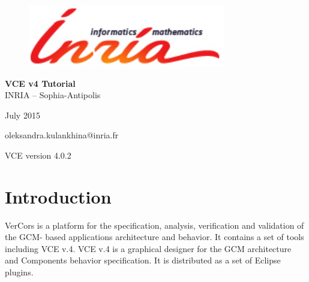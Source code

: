 \documentclass[12pt]{article}
\begin{document}
\begin{titlepage}

\begin{figure}[t]
    \centering
    \includegraphics[scale=0.4]{./draws/inria-logo.png}
\end{figure}

\vspace*{2cm}
\begin{center}
	{\huge \textbf{VCE v4 Tutorial}} \vspace*{1cm}
\\
    {\large INRIA – Sophia-Antipolis } \medskip \\
\end{center}

%
\vfill
\begin{center}
\begin{minipage}[b]{0.5\textwidth}
    \vspace*{1.3cm}
    \begin{center}
        {\large July 2015}
    \end{center}
        \begin{center}
        {\large oleksandra.kulankhina@inria.fr}
    \end{center}
     \vspace*{1cm}
        \begin{center}
        {\large VCE version 4.0.2}
    \end{center}
\end{minipage}%
\end{center}

\thispagestyle{empty}

\end{titlepage}

\tableofcontents
\newpage

\section{Introduction}\label{sec:intro}
VerCors is a platform for the specification, analysis, verification and validation of the GCM-
based applications architecture and behavior. It contains a set of tools including VCE v.4. VCE v.4 is a graphical designer for the GCM architecture and Components behavior specification. It is distributed as a set of Eclipse plugins.
\end{document}
